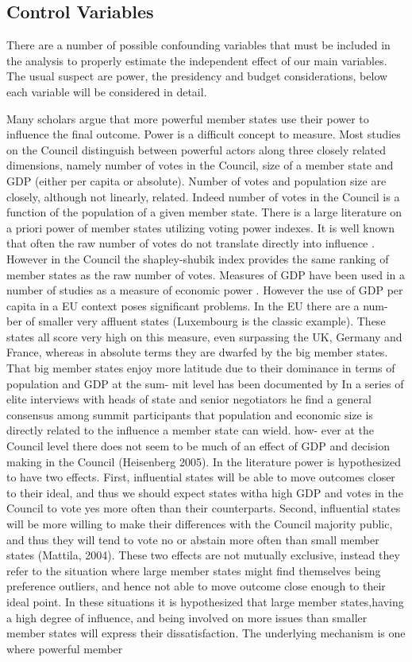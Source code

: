 \subsection{Control Variables}

There are a number of possible confounding variables that must be included in the analysis to properly estimate the independent effect of our main variables. The usual suspect are power, the presidency and budget considerations, below each variable will be considered in detail. 

Many scholars argue that more powerful member states use their power to influence the final outcome. Power is a difficult concept to measure. Most studies on the Council distinguish between powerful actors along three closely related dimensions, namely number of votes in the Council, size of a member state and GDP (either per capita or absolute). Number of votes and population size are closely, although not linearly, related. Indeed number of votes in the Council is a function of the population of a given member state. There is a large literature on a priori power of member states utilizing voting power indexes. It is well known that often the raw number of votes do not translate directly into influence \citep{Gelman2003a}. However in the Council the shapley-shubik index provides the same ranking of member states as the raw number of votes. Measures of GDP have been used in a number of studies as a measure of economic power \citep{DeSoysa1997}. However the use of GDP per capita in a EU context poses significant problems. In the EU there are a num- ber of smaller very affluent states (Luxembourg is the classic example). These states all score very high on this measure, even surpassing the UK, Germany and France, whereas in absolute terms they are dwarfed by the big member states. That big member states enjoy more latitude due to their dominance in terms of population and GDP at the sum- mit level has been documented by \citet{Tallberg2008} In a series of elite interviews with heads of state and senior negotiators he find a general consensus among summit participants that population and economic size is directly related to the influence a member state can wield. how- ever at the Council level there does not seem to be much of an effect of GDP and decision making in the Council (Heisenberg 2005). In the literature power is hypothesized to have two effects. First, influential states will be able to move outcomes closer to their ideal, and thus we should expect states witha high GDP and votes in the Council to vote yes more often than their counterparts. Second, influential states will be more willing to make their differences with the Council majority public, and thus they will tend to vote no or abstain more often than small member states (Mattila, 2004). These two effects are not mutually exclusive, instead they refer to the situation where large member states might find themselves being preference outliers, and hence not able to move outcome close enough to their ideal point. In these situations it is hypothesized that large member states,having a high degree of influence, and being involved on more issues than smaller member states will express their dissatisfaction. The underlying mechanism is one where powerful member 